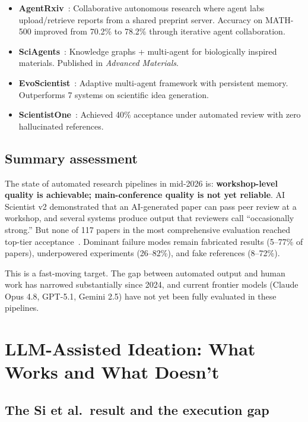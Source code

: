 \documentclass[11pt,a4paper]{article}
\begin{document}
\begin{itemize}
\item \textbf{AgentRxiv}~\cite{agentrxiv2025}: Collaborative autonomous research where agent labs upload/retrieve reports from a shared preprint server. Accuracy on MATH-500 improved from 70.2\% to 78.2\% through iterative agent collaboration.
\item \textbf{SciAgents}~\cite{sciagents2025}: Knowledge graphs + multi-agent for biologically inspired materials. Published in \emph{Advanced Materials}.
\item \textbf{EvoScientist}~\cite{evoscientist2026}: Adaptive multi-agent framework with persistent memory. Outperforms 7 systems on scientific idea generation.
\item \textbf{ScientistOne}~\cite{scientistone2026}: Achieved 40\% acceptance under automated review with zero hallucinated references.
\end{itemize}

\subsection{Summary assessment}

The state of automated research pipelines in mid-2026 is: \textbf{workshop-level quality is achievable; main-conference quality is not yet reliable}. AI Scientist v2 demonstrated that an AI-generated paper can pass peer review at a workshop, and several systems produce output that reviewers call ``occasionally strong.'' But none of 117 papers in the most comprehensive evaluation reached top-tier acceptance~\cite{scholarpeer2026}. Dominant failure modes remain fabricated results (5--77\% of papers), underpowered experiments (26--82\%), and fake references (8--72\%).

This is a fast-moving target. The gap between automated output and human work has narrowed substantially since 2024, and current frontier models (Claude Opus 4.8, GPT-5.1, Gemini 2.5) have not yet been fully evaluated in these pipelines.


\section{LLM-Assisted Ideation: What Works and What Doesn't}
\label{sec:ideation}

\subsection{The Si et al.\ result and the execution gap}
\end{document}
